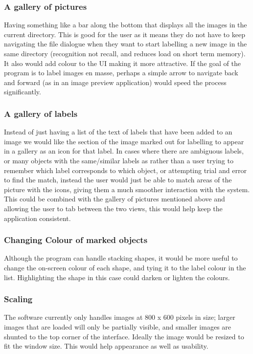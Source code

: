 \documentclass[a4paper,11pt,oneside]{article}
\begin{document}
\subsubsection{A gallery of pictures} 
Having something like a bar along the bottom that displays all the images in the
current directory.  This is good for the user as it means they do not have to
keep navigating the file dialogue when they want to start labelling a new image
in the same directory (recognition not recall, and reduces load on short term
memory).  It also would add colour to the UI making it more attractive. If the
goal of the program is to label images en masse, perhaps a simple arrow to
navigate back and forward (as in an image preview application) would speed the
process significantly.
\subsubsection{A gallery of labels}
Instead of just having a list of the text of labels that have been added to an
image we would like the section of the image marked out for labelling to appear
in a gallery as an icon for that label.  In cases where there are ambiguous
labels, or many objects with the same/similar labels as rather than a user
trying to remember which label corresponds to which object, or attempting trial
and error to find the match, instead the user would just be able to match areas
of the picture with the icons, giving them a much smoother interaction with the
system.  This could be combined with the gallery of pictures mentioned above and
allowing the user to tab between the two views, this would help keep the
application consistent.
\subsubsection{Changing Colour of marked objects}
Although the program can handle stacking shapes, it would be more useful to
change the on-screen colour of each shape, and tying it to the label colour in
the list. Highlighting the shape in this case could darken or lighten the
colours.
\subsubsection{Scaling}
The software currently only handles images at 800 x 600 pixels in size;
larger images that are loaded will only be partially visible, and smaller
images are shunted to the top corner of the interface. Ideally the image would
be resized to fit the window size. This would help appearance as well as
usability.
\end{document}
